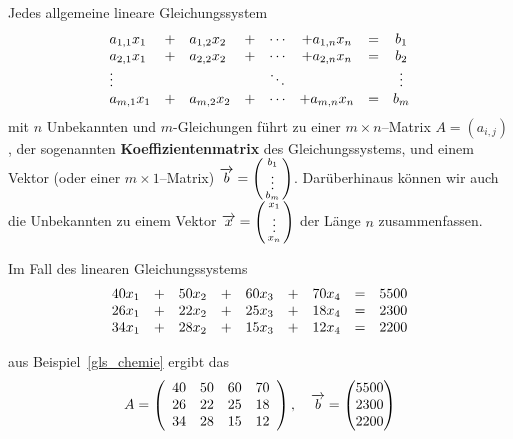 \begin{beispiel} Jedes allgemeine lineare Gleichungssystem 
  $$ \begin{array} {l c l c c c l c l }
  a_{1,1} x_1 & + & a_{1,2} x_2 & + & \cdots & + a_{1,n} x_n & = & b_1 \\
  a_{2,1} x_1 & + & a_{2,2} x_2 & + & \cdots & + a_{2,n} x_n & = & b_2 \\
  \vdots & & & & \ddots & & & \vdots \\
  a_{m,1} x_1 & + & a_{m,2} x_2 & + & \cdots & + a_{m,n} x_n & = & b_m 
  \end{array} $$
mit $n$ Unbekannten und $m$-Gleichungen führt zu einer $m \times n$--Matrix $A = \left(a_{i,j}\right)$, der 
sogenannten \textbf{Koeffizientenmatrix} des Gleichungssystems, 
und einem Vektor (oder einer $m \times 1$--Matrix) $\overrightarrow{b} 
= \left( \begin{smallmatrix} b_1 \\ \vdots \\ b_m \end{smallmatrix} \right)$. Darüberhinaus 
können wir auch die Unbekannten zu einem Vektor $\overrightarrow{x} 
= \left( \begin{smallmatrix} x_1 \\ \vdots \\ x_n \end{smallmatrix} \right)$ der Länge $n$ zusammenfassen.

Im Fall des linearen Gleichungssystems
  $$ \begin{array} {l c l c l c l c l}
   40 x_1 & + & 50 x_2 & + & 60 x_3 & + & 70 x_4 & = & 5500 \\
   26 x_1 & + & 22 x_2 & + & 25 x_3 & + & 18 x_4 & = & 2300 \\
   34 x_1 & + & 28 x_2 & + & 15 x_3 & + & 12 x_4 & = & 2200 \\
   \end{array} $$

aus Beispiel~\ref{gls_chemie} ergibt das
  $$ A = \left( \begin{array} {l l l l} 40 & 50 & 60 & 70 \\ 26 & 22 & 25 & 18 \\
         34 & 28 & 15 & 12 \end{array} \right), \quad \overrightarrow{b} 
       = \left( \begin{matrix} 5500 \\ 2300 \\ 2200 \end{matrix} \right) $$


\end{beispiel}
